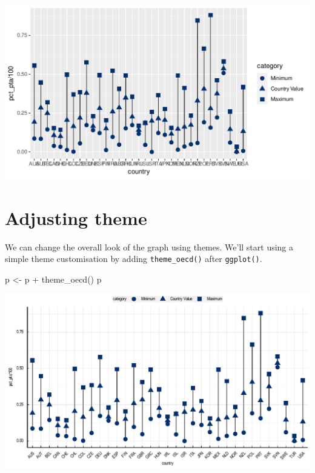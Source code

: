 \documentclass[
  11pt,
  oneside]{report}
\newenvironment{Shaded}{\begin{snugshade}}{\end{snugshade}}
\newcommand{\FunctionTok}[1]{\textcolor[rgb]{0.00,0.00,0.00}{#1}}
\newcommand{\NormalTok}[1]{#1}
\newcommand{\OtherTok}[1]{\textcolor[rgb]{0.56,0.35,0.01}{#1}}
\newcommand{\SpecialCharTok}[1]{\textcolor[rgb]{0.00,0.00,0.00}{#1}}
\begin{document}
\begin{center}\includegraphics{book_figures/maxmin_1-1} \end{center}

\hypertarget{adjusting-theme-2}{%
\section{Adjusting theme}\label{adjusting-theme-2}}

We can change the overall look of the graph using themes. We'll start
using a simple theme customisation by adding \texttt{theme\_oecd()}
after \texttt{ggplot()}.

\begin{Shaded}
\begin{Highlighting}[]
\NormalTok{p }\OtherTok{\textless{}{-}}\NormalTok{ p }\SpecialCharTok{+}
  \FunctionTok{theme\_oecd}\NormalTok{()}
\NormalTok{p}
\end{Highlighting}
\end{Shaded}

\begin{center}\includegraphics{book_figures/maxmin_2-1} \end{center}
\end{document}
